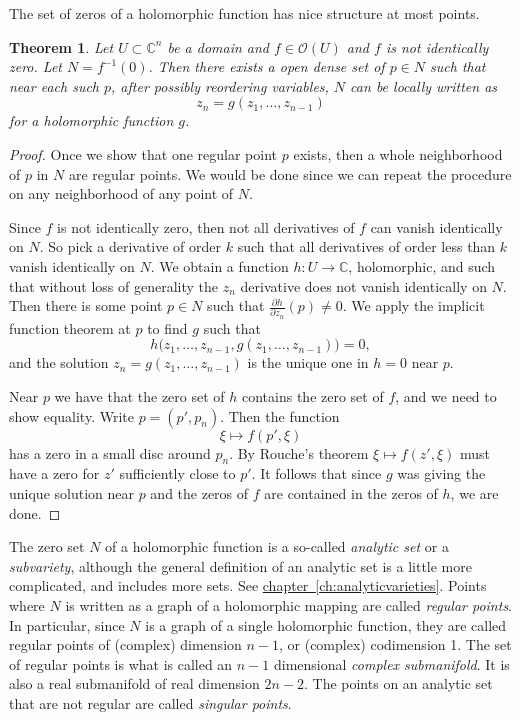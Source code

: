 \documentclass[12pt,openany]{book}
\newcommand{\C}{{\mathbb{C}}}
\newcommand{\sO}{{\mathcal{O}}}
\newcommand{\myindex}[1]{#1\index{#1}}
\theoremstyle{plain}
\newtheorem{thm}{Theorem}[section]
\theoremstyle{remark}
\theoremstyle{definition}
\theoremstyle{exercise}
\theoremstyle{example}
\newcommand{\chapterref}[1]{\hyperref[#1]{chapter~\ref*{#1}}}
\begin{document}
The set of zeros of a holomorphic function has nice structure at most
points.

\begin{thm} \label{thm:regptsdense}
Let $U \subset \C^n$ be a domain and
$f \in \sO(U)$ and $f$ is not identically zero.
Let $N = f^{-1}(0)$.  Then there exists a open dense set of $p \in N$
such that near each such $p$, after possibly reordering variables,
$N$ can be locally written as
\begin{equation*}
z_n = g(z_1,\ldots,z_{n-1})
\end{equation*}
for a holomorphic function $g$.
\end{thm}

\begin{proof}
Once we show that one regular point $p$ exists, then a whole
neighborhood of $p$ in $N$ are regular points.  We would be done
since we can
repeat the procedure on any neighborhood of any point of $N$.

Since $f$ is not identically zero, then not all derivatives of $f$
can vanish identically on $N$.  So pick a derivative of order $k$
such that all derivatives of order less than $k$ vanish identically on $N$.
We obtain a function $h \colon U \to \C$, holomorphic, and such that 
without loss of generality the $z_n$ derivative does not vanish identically
on $N$.  Then there is some point $p \in N$ such that $\frac{\partial
h}{\partial z_n}(p) \not= 0$.
We apply the implicit function theorem at $p$ to find $g$ such that
\begin{equation*}
h\bigr(z_1,\ldots,z_{n-1},g(z_1,\ldots,z_{n-1})\bigr) = 0 ,
\end{equation*}
and the solution $z_n = g(z_1,\ldots,z_{n-1})$ is the unique one
in $h=0$ near $p$.

Near $p$ we have that the zero set of $h$ contains the zero set of $f$, and
we need to show equality.
Write $p = (p',p_n)$.  Then the function
\begin{equation*}
\xi \mapsto f(p',\xi)
\end{equation*}
has a zero in a small disc around $p_n$.  By Rouche's theorem
$\xi \mapsto f(z',\xi)$ must have a zero for $z'$ sufficiently close to $p'$.
It follows that since $g$ was giving the unique solution near $p$ and the
zeros of $f$ are contained in the zeros of $h$, we are done.
\end{proof}

The zero set $N$ of a holomorphic function is a so-called
\emph{\myindex{analytic set}} or a \emph{\myindex{subvariety}},
although the general definition of an
analytic set is a little more complicated, and includes more sets.
See \chapterref{ch:analyticvarieties}.
Points where $N$ is written as a graph of a holomorphic mapping are called
\emph{regular points}.  In particular,
since $N$ is a graph of a single holomorphic function, they are called
regular points of (complex) dimension $n-1$, or (complex) codimension 1.
The set of regular points is what is called an
$n-1$ dimensional \emph{\myindex{complex submanifold}}.  It is also a real
submanifold of real dimension $2n-2$.
The points on an analytic set that are not regular are called
\emph{singular points}.
\end{document}
